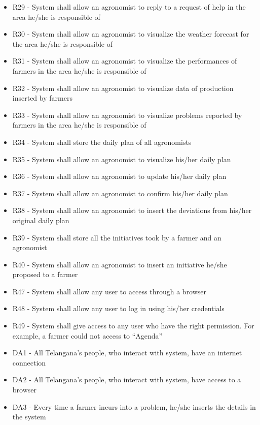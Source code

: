\begin{enumerate}[label=\textbf{G.\arabic*}]
\begin{enumerate} [label=\textbf{G.4.\arabic*}]
\begin{itemize} [label =]
            \item R29 - System shall allow an agronomist to reply to a request of help in the area he/she is responsible of
            \item R30 - System shall allow an agronomist to visualize the weather forecast for the area he/she is responsible of
            \item R31 - System shall allow an agronomist to visualize the performances of farmers in the area he/she is responsible of
            \item R32 - System shall allow an agronomist to visualize data of production inserted by farmers
            \item R33 - System shall allow an agronomist to visualize problems reported by farmers in the area he/she is responsible of
            \item R34 - System shall store the daily plan of all agronomists
            \item R35 - System shall allow an agronomist to visualize his/her daily plan
            \item R36 - System shall allow an agronomist to update his/her daily plan
            \item R37 - System shall allow an agronomist to confirm his/her daily plan
            \item R38 - System shall allow an agronomist to insert the deviations from his/her original daily plan
            \item R39 - System shall store all the initiatives took by a farmer and an agronomist
            \item R40 - System shall allow an agronomist to insert an initiative he/she proposed to a farmer
            \item R47 - System shall allow any user to access through a browser
            \item R48 - System shall allow any user to log in using his/her credentials
            \item R49 - System shall give access to any user who have the right permission. For example, a farmer could not access to “Agenda”
            \item DA1 - All Telangana’s people, who interact with system, have an internet connection
            \item DA2 - All Telangana’s people, who interact with system, have access to a browser
            \item DA3 - Every time a farmer incurs into a problem, he/she inserts the details in the system

\end{itemize}
\end{enumerate}
\end{enumerate}
